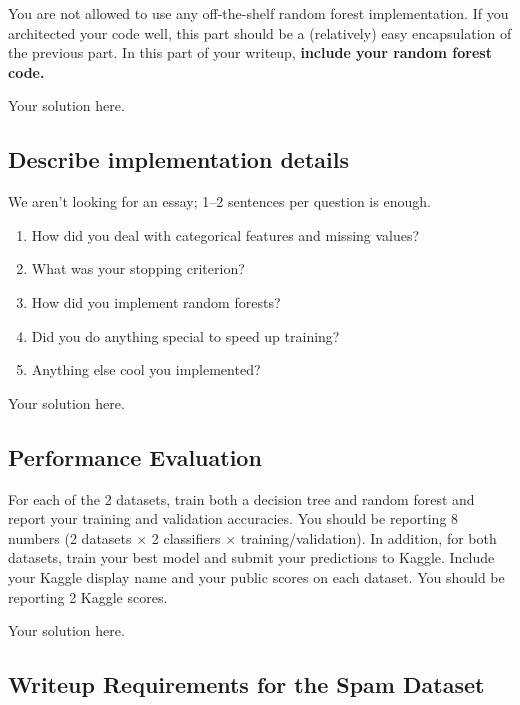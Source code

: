 You are not allowed to use any off-the-shelf random forest implementation. If you architected your code well, this part should be a (relatively) easy encapsulation of the previous part. In this part of your writeup, \textbf{include your random forest code.}

\begin{solution}
Your solution here.
\end{solution}

\subsection{\bf  Describe implementation details}

We aren't looking for an essay; 1--2 sentences per question is enough.
\begin{enumerate}
	\item How did you deal with categorical features and missing values?
	\item What was your stopping criterion?
	\item How did you implement random forests?
	\item Did you do anything special to speed up training?
	\item Anything else cool you implemented?
\end{enumerate}

\begin{solution}
Your solution here.
\end{solution}

\subsection{\bf  Performance Evaluation}

For each of the 2 datasets, train both a decision tree and random forest and report your training and validation accuracies. You should be reporting 8 numbers (2 datasets $\times$ 2 classifiers $\times$ training/validation). In addition, for both datasets, train your best model and submit your predictions to Kaggle. Include your Kaggle display name and your public scores on each dataset. You should be reporting 2 Kaggle scores.

\begin{solution}
Your solution here.
\end{solution}


\subsection{\bf  Writeup Requirements for the Spam Dataset}

